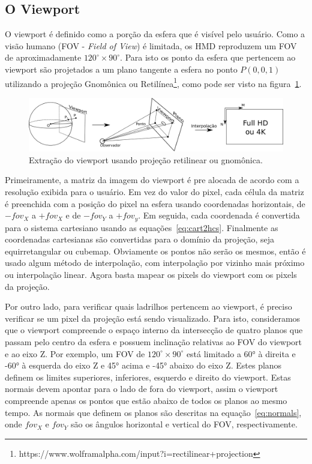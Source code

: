 \subsection{O Viewport}

O viewport é definido como a porção da esfera que é visível pelo usuário. Como a visão humano (FOV -\textit{ Field of View}) é limitada, os HMD reproduzem um FOV de aproximadamente $120^\circ\times90^\circ$. Para isto os ponto da esfera que pertencem ao viewport são projetados a um plano tangente a esfera no ponto $ P(0, 0, 1) $ utilizando a projeção Gnomônica ou Retilínea\footnote{https://www.wolframalpha.com/input?i=rectilinear+projection}, como pode ser visto na figura~\ref{fig:projecao_viewport}. 

\begin{figure}[htb]
    \centering
    \includegraphics[width=1.0\linewidth]{fig/projecao_viewport.png}
    \caption{Extração do viewport usando projeção retilinear ou gnomônica.}
    \label{fig:projecao_viewport}
\end{figure}

Primeiramente, a matriz da imagem do viewport é pre alocada de acordo com a resolução exibida para o usuário. Em vez do valor do pixel, cada célula da matriz é preenchida com a posição do pixel na esfera usando coordenadas horizontais, de $-fov_X$ a $+fov_X$ e de $-fov_Y$ a $+fov_y$. Em seguida, cada coordenada é convertida para o sistema cartesiano usando as equações~\ref{eq:cart2hcs}. Finalmente as coordenadas cartesianas são convertidas para o domínio da projeção, seja equirretangular ou cubemap. Obviamente os pontos não serão os mesmos, então é usado algum método de interpolação, com interpolação por vizinho mais próximo ou interpolação linear. Agora basta mapear os pixels do viewport com os pixels da projeção.

Por outro lado, para verificar quais ladrilhos pertencem ao viewport, é preciso verificar se um pixel da projeção está sendo visualizado. Para isto, consideramos que o viewport compreende o espaço interno da intersecção de quatro planos que passam pelo centro da esfera e possuem inclinação relativas ao FOV do viewport e ao eixo Z. Por exemplo, um FOV de $ 120^\circ\times 90^\circ $ está limitado a 60° à direita e -60° à esquerda do eixo Z e 45° acima e -45° abaixo do eixo Z. Estes planos definem os limites superiores, inferiores, esquerdo e direito do viewport. Estas normais devem apontar para o lado de fora do viewport, assim o viewport compreende apenas os pontos que estão abaixo de todos os planos ao mesmo tempo. As normais que definem os planos são descritas na equação~\ref{eq:normals}, onde $fov_X$ e $fov_Y$ são os ângulos horizontal e vertical do FOV, respectivamente.

